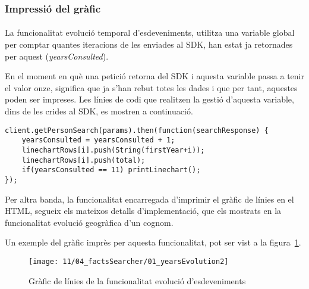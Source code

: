 \subsubsection{Impressió del gràfic}

\paragraph{}
La funcionalitat evolució temporal d'esdeveniments, utilitza una variable global per comptar quantes iteracions de les enviades al SDK, han estat ja retornades per aquest (\emph{yearsConsulted}).

En el moment en què una petició retorna del SDK i aquesta variable passa a tenir el valor onze, significa que ja s'han rebut totes les dades i que per tant, aquestes poden ser impreses. Les línies de codi que realitzen la gestió d'aquesta variable, dins de les crides al SDK, es mostren a continuació.

\begin{lstlisting}[style=rawOwn,caption={Gestió de la variable \emph{yearsConsulted}, per controlar el final de la cerca}]
client.getPersonSearch(params).then(function(searchResponse) {
    yearsConsulted = yearsConsulted + 1;
    linechartRows[i].push(String(firstYear+i));
    linechartRows[i].push(total);
    if(yearsConsulted == 11) printLinechart();
});
\end{lstlisting}

Per altra banda, la funcionalitat encarregada d’imprimir el gràfic de línies en el HTML, segueix els mateixos detalls d’implementació, que els mostrats en la fun\-cio\-na\-li\-tat evolució geogràfica d’un cognom.

Un exemple del gràfic imprès per aquesta funcionalitat, pot ser vist a la fi\-gura~\ref{fig:factsLine}.

\begin{figure}[h]
    \texttt{[image: 11/04\_factsSearcher/01\_yearsEvolution2]}
    \centering
    \caption{Gràfic de línies de la funcionalitat evolució d'esdeveniments}\label{fig:factsLine}
\end{figure}
